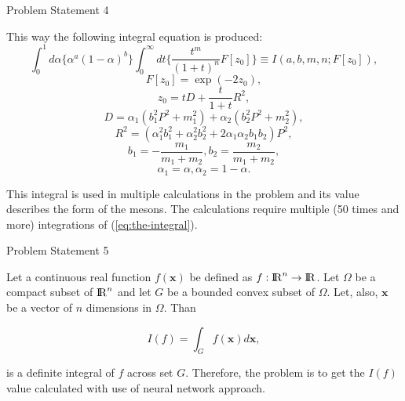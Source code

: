 \documentclass[9pt]{beamer}
\begin{document}
\begin{frame}{Problem Statement 4}

This way the following integral equation is produced:
\begin{equation}
    \label{eq:the-integral}
    \int_{0}^{1}d\alpha\{\alpha^{a}(1 - \alpha)^b\}\int_{0}^{\infty}dt\{\frac{t^m}{(1+t)^n}F[z_{0}]\} \equiv I(a, b, m, n; F[z_{0}]),
\end{equation}
\begin{equation*}   
    F[z_0] = \exp(-2z_0),
\end{equation*}
\begin{equation*} 
    z_0 = tD + \frac{t}{1 + t}R^2,
\end{equation*}
\begin{equation*}     
    D = \alpha_1(b_1^{2}P^2 + m_1^2) + \alpha_2(b_2^{2}P^2 + m_2^2),
\end{equation*}
\begin{equation*} 
        R^2 = (\alpha_1^{2}b_1^2 + \alpha_2^{2}b_2^2 + 2\alpha_{1}\alpha_{2}b_{1}b_2)P^2,
\end{equation*}
\begin{equation*} 
    b_1 = -\frac{m_1}{m_1 + m_2},
    b_2 = \frac{m_2}{m_1 + m_2},
\end{equation*}
\begin{equation*}
    \alpha_1 = \alpha, \alpha_2 = 1 - \alpha.
\end{equation*}


\noindent This integral is used in multiple calculations in the problem and its value describes the form of the mesons. The calculations require multiple (50 times and more) integrations of (\ref{eq:the-integral}).
    
\end{frame}

\begin{frame}{Problem Statement 5}

Let a continuous real function $f(\mathbf{x})$ be defined as $f: {\rm I\!R}^n \to {\rm I\!R}$. Let $\Omega$ be a compact subset of ${\rm I\!R}^n$ and let $G$ be a bounded convex subset of $\Omega$. Let, also, $\mathbf{x}$ be a vector of $n$ dimensions in $\Omega$. Than

\begin{equation}
    \label{eq: integral definition}
    I(f) = \int_G f(\mathbf{x})d\mathbf{x},
\end{equation}

\noindent is a definite integral of $f$ across set $G$. Therefore, the problem is to get the $I(f)$ value calculated with use of neural network approach.    
\end{frame}
\end{document}
